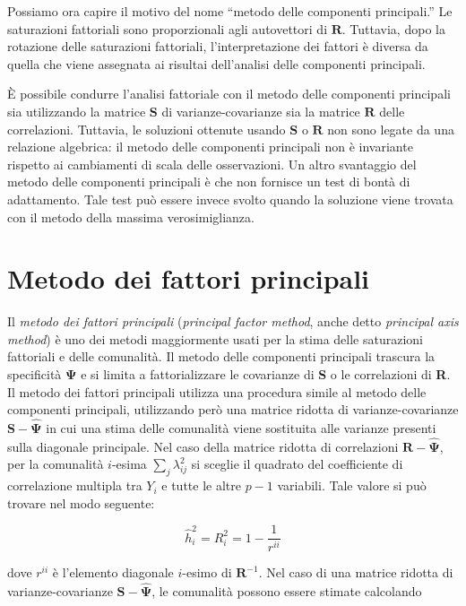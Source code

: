 \documentclass[
  11pt,
]{krantz}
\theoremstyle{definition}
\theoremstyle{definition}
\theoremstyle{definition}
\theoremstyle{definition}
\theoremstyle{remark}
\begin{document}
Possiamo ora capire il motivo del nome ``metodo delle componenti principali.'' Le saturazioni fattoriali sono proporzionali agli autovettori di \(\textbf{R}\). Tuttavia, dopo la rotazione delle saturazioni fattoriali, l'interpretazione dei fattori è diversa da quella che viene assegnata ai risultai dell'analisi delle componenti principali.

È possibile condurre l'analisi fattoriale con il metodo delle componenti principali sia utilizzando la matrice \(\textbf{S}\) di varianze-covarianze sia la matrice \(\textbf{R}\) delle correlazioni. Tuttavia, le soluzioni ottenute usando \(\textbf{S}\) o \(\textbf{R}\) non sono legate da una relazione algebrica: il metodo delle componenti principali non è invariante rispetto ai cambiamenti di scala delle osservazioni. Un altro svantaggio del metodo delle componenti principali è che non fornisce un test di bontà di adattamento. Tale test può essere invece svolto quando la soluzione viene trovata con il metodo della massima verosimiglianza.

\hypertarget{metodo-dei-fattori-principali}{%
\section{Metodo dei fattori principali}\label{metodo-dei-fattori-principali}}

Il \emph{metodo dei fattori principali} (\emph{principal factor method}, anche detto \emph{principal axis method}) è uno dei metodi maggiormente usati per la stima delle saturazioni fattoriali e delle comunalità. Il metodo delle componenti principali trascura la specificità \(\boldsymbol{\Psi}\) e si limita a fattorializzare le covarianze di \textbf{S} o le correlazioni di \textbf{R}. Il metodo dei fattori principali utilizza una procedura simile al metodo delle componenti principali, utilizzando però una matrice ridotta di varianze-covarianze \(\textbf{S} -  \hat{\boldsymbol{\Psi}}\) in cui una stima delle comunalità viene sostituita alle varianze presenti sulla diagonale principale. Nel caso della matrice ridotta di correlazioni \(\textbf{R} - \hat{\boldsymbol{\Psi}}\), per la comunalità \(i\)-esima \(\sum_{j}\lambda_{ij}^2\) si sceglie il quadrato del coefficiente di correlazione multipla tra \(Y_i\) e tutte le altre \(p-1\) variabili. Tale valore si può trovare nel modo seguente:

\[\hat{h}^2_i=R^2_i=1-\frac{1}{r^{ii}}\]

dove \(r^{ii}\) è l'elemento diagonale \(i\)-esimo di \(\textbf{R}^{-1}\). Nel caso di una matrice ridotta di varianze-covarianze \(\textbf{S} - \hat{\boldsymbol{\Psi}}\), le comunalità possono essere stimate calcolando
\end{document}
